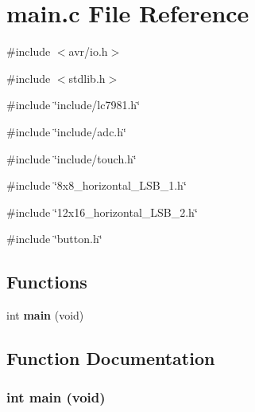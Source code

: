 \section{main.c File Reference}
\label{main_8c}
{\ttfamily \#include $<$avr/io.h$>$}\par
{\ttfamily \#include $<$stdlib.h$>$}\par
{\ttfamily \#include \char`\"{}include/lc7981.h\char`\"{}}\par
{\ttfamily \#include \char`\"{}include/adc.h\char`\"{}}\par
{\ttfamily \#include \char`\"{}include/touch.h\char`\"{}}\par
{\ttfamily \#include \char`\"{}8x8\_\-horizontal\_\-LSB\_\-1.h\char`\"{}}\par
{\ttfamily \#include \char`\"{}12x16\_\-horizontal\_\-LSB\_\-2.h\char`\"{}}\par
{\ttfamily \#include \char`\"{}button.h\char`\"{}}\par
\subsection*{Functions}
\begin{DoxyCompactItemize}
\item 
int {\bf main} (void)
\end{DoxyCompactItemize}


\subsection{Function Documentation}
\subsubsection[{main}]{\setlength{\rightskip}{0pt plus 5cm}int main (void)}\label{main_8c_a840291bc02cba5474a4cb46a9b9566fe}

